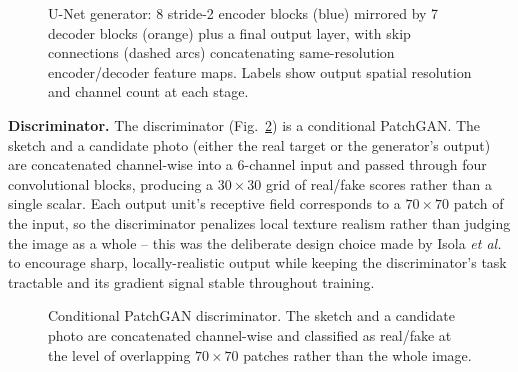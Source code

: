 \documentclass[conference]{IEEEtran}
\begin{document}
\begin{figure}[t]
{}
\caption{U-Net generator: 8 stride-2 encoder blocks (blue) mirrored by 7 decoder blocks
(orange) plus a final output layer, with skip connections (dashed arcs) concatenating
same-resolution encoder/decoder feature maps. Labels show output spatial resolution and
channel count at each stage.}
\label{fig:generator}
\end{figure}

\textbf{Discriminator.} The discriminator (Fig.~\ref{fig:discriminator}) is a conditional
PatchGAN. The sketch and a candidate photo (either the real target or the generator's
output) are concatenated channel-wise into a 6-channel input and passed through four
convolutional blocks, producing a $30\times30$ grid of real/fake scores rather than a
single scalar. Each output unit's receptive field corresponds to a $70\times70$ patch of
the input, so the discriminator penalizes local texture realism rather than judging the
image as a whole -- this was the deliberate design choice made by Isola \textit{et al.}
to encourage sharp, locally-realistic output while keeping the discriminator's task
tractable and its gradient signal stable throughout training.

\begin{figure}[t]
\centering
{}
\caption{Conditional PatchGAN discriminator. The sketch and a candidate photo are
concatenated channel-wise and classified as real/fake at the level of overlapping
$70\times70$ patches rather than the whole image.}
\label{fig:discriminator}
\end{figure}
\end{document}
